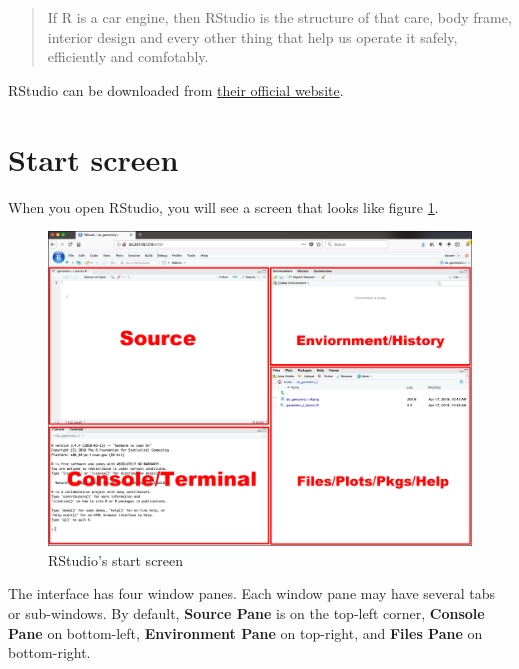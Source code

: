 \documentclass[
]{book}
\begin{document}
\begin{quote}
If R is a car engine, then RStudio is the structure of that care, body frame, interior design and every other thing that help us operate it safely, efficiently and comfotably.
\end{quote}

RStudio can be downloaded from \href{https://rstudio.com/products/rstudio/download}{their official website}.

\hypertarget{start-screen}{%
\section{Start screen}\label{start-screen}}

When you open RStudio, you will see a screen that looks like figure \ref{fig:startscreen}.

\begin{figure}
\includegraphics[width=1\linewidth]{img/rstudio_interface} \caption{RStudio's start screen}\label{fig:startscreen}
\end{figure}

The interface has four window panes. Each window pane may have several tabs or sub-windows. By default, \textbf{Source Pane} is on the top-left corner, \textbf{Console Pane} on bottom-left, \textbf{Environment Pane} on top-right, and \textbf{Files Pane} on bottom-right.
\end{document}
